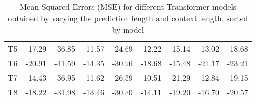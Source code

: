 \begin{table}[]
{\begin{tabular}{
    >{\columncolor[HTML]{FFFFFF}}c cccccccc}
    T5    & \cellcolor[HTML]{FDBD7B}-17.29   & \cellcolor[HTML]{FFEB84}-36.85              & \cellcolor[HTML]{F8696B}-11.57 & \cellcolor[HTML]{FCAA78}-24.69       & \cellcolor[HTML]{FCB079}-12.22            & \cellcolor[HTML]{FCAD79}-15.14           & \cellcolor[HTML]{F96E6C}-13.02      & \cellcolor[HTML]{FB9C75}-18.68 \\
    T6    & \cellcolor[HTML]{6BC07B}-20.91   & \cellcolor[HTML]{83C77C}-41.59              & \cellcolor[HTML]{F1E783}-14.35 & \cellcolor[HTML]{64BE7B}-30.26       & \cellcolor[HTML]{97CD7E}-18.68            & \cellcolor[HTML]{FCB27A}-15.48           & \cellcolor[HTML]{8AC97D}-21.17      & \cellcolor[HTML]{ADD37F}-23.21 \\
    T7    & \cellcolor[HTML]{F8696B}-14.43   & \cellcolor[HTML]{FDEA83}-36.95              & \cellcolor[HTML]{F96D6C}-11.62 & \cellcolor[HTML]{FFDC81}-26.39       & \cellcolor[HTML]{FA7D6F}-10.51            & \cellcolor[HTML]{C5DA80}-21.29           & \cellcolor[HTML]{F8696B}-12.84      & \cellcolor[HTML]{FCA978}-19.15 \\
    T8    & \cellcolor[HTML]{FED881}-18.22   & \cellcolor[HTML]{FA8871}-31.98              & \cellcolor[HTML]{FEEA83}-13.46 & \cellcolor[HTML]{63BE7B}-30.30       & \cellcolor[HTML]{FFE784}-14.11            & \cellcolor[HTML]{FFEA84}-19.20           & \cellcolor[HTML]{FED17F}-16.70      & \cellcolor[HTML]{FED280}-20.57
    \end{tabular}%
    }
    \caption{Mean Squared Errors (MSE) for different Transformer models obtained by varying the prediction length and context length, sorted by model}
    \label{T1_M}
    \end{table}


